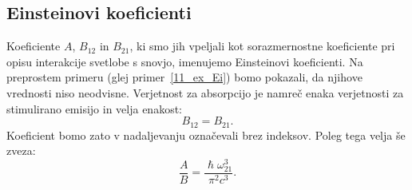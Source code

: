 \subsection*{Einsteinovi koeficienti}
Koeficiente $A$, $B_{12}$ in $B_{21}$, ki smo jih vpeljali kot sorazmernostne
koeficiente pri opisu interakcije svetlobe s snovjo, imenujemo Einsteinovi 
koeficienti. Na preprostem primeru (glej primer~\ref{11_ex_Ei}) bomo pokazali, 
da njihove vrednosti niso neodvisne. Verjetnost za absorpcijo 
je namreč enaka verjetnosti za stimulirano emisijo in velja enakost:
\begin{equation}
B_{12}=B_{21}.
\label{eq:11_13}
\end{equation}
Koeficient bomo zato v nadaljevanju označevali brez indeksov. Poleg tega velja še zveza:
\begin{equation}
\frac{A}{B} = \frac{\hslash \omega_{21}^3}{\pi^2c^3}.
\label{eq:11_14}
\end{equation}
